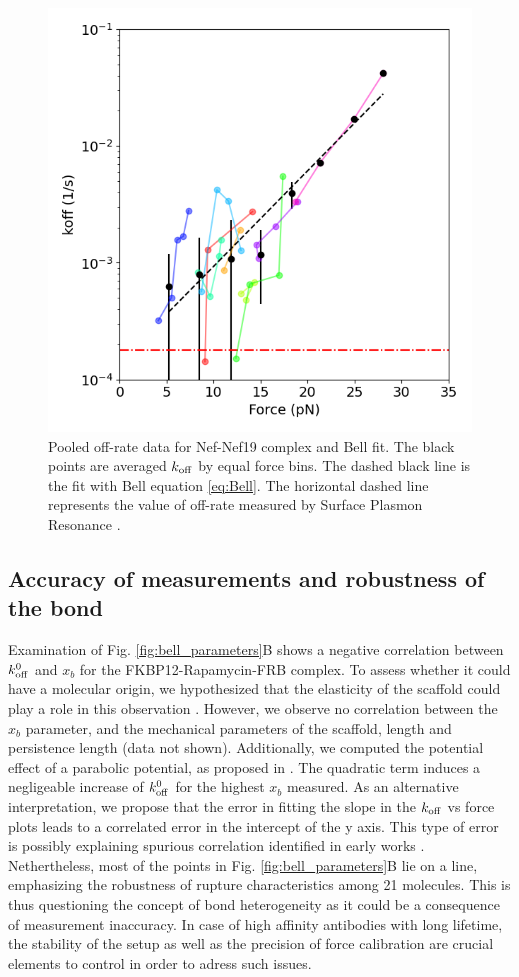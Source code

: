\documentclass{biophys-new}
\begin{document}
\begin{figure}[hbt!]
	\centering
		\includegraphics[width=0.4\linewidth]{Figures/offrate_vs_force_Nef.png}	
	\caption{Pooled off-rate data for Nef-Nef19 complex and Bell fit. The black points are averaged $k_{\rm off}$ by equal force bins. The dashed black line is the fit with Bell equation \ref{eq:Bell}. The horizontal dashed line represents the value of off-rate measured by Surface Plasmon Resonance \cite{bouchet2011}.} %
	\label{fig:bell_parameters_Nef}	
\end{figure}

\subsection*{Accuracy of measurements and robustness of the bond}

Examination of Fig. \ref{fig:bell_parameters}B shows a negative correlation between $k^0_{\rm off}$ and $x_b$ for the FKBP12-Rapamycin-FRB complex. To assess whether it could have a molecular origin, we hypothesized that the elasticity of the scaffold could play a role in this observation \cite{walton2008}. However, we observe no correlation between the $x_b$ parameter, and the mechanical parameters of the scaffold, length and persistence length (data not shown). Additionally, we computed the potential effect of a parabolic potential, as proposed in \cite{friddle2012}. The quadratic term induces a negligeable increase of $k^0_{\rm off}$ for the highest $x_b$ measured. As an alternative interpretation, we propose that the error in fitting the slope in the $k_{\rm off}$ vs force plots leads to a correlated error in the intercept of the y axis. This type of error is possibly explaining spurious correlation identified in early works \cite{schwesinger2000}. Nethertheless, most of the points in Fig. \ref{fig:bell_parameters}B lie on a line, emphasizing the robustness of rupture characteristics among 21 molecules. This is thus questioning the concept of bond heterogeneity \cite{raible2006} as it could be a consequence of measurement inaccuracy. In case of high affinity antibodies with long lifetime, the stability of the setup as well as the precision of force calibration are crucial elements to control in order to adress such issues.
\end{document}
